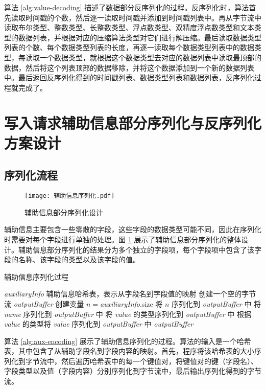 算法 \ref{alg:value-decoding} 描述了数据部分反序列化的过程。反序列化时，算法首先读取时间戳的个数，然后逐一读取时间戳并添加到时间戳列表中。再从字节流中读取布尔类型、整数类型、长整数类型、浮点数类型、双精度浮点数类型和文本类型的数据列表，并根据对应的压缩算法类型对它们进行解压缩。最后读取数据类型列表的个数、每个数据类型列表的长度，再逐一读取每个数据类型列表中的数据类型，每读取一个数据类型，就根据这个数据类型去对应的数据列表中读取最顶部的数据，然后将这个列表顶部的数据移除，并将这个数据添加到一个新的数据列表中。最后返回反序列化得到的时间戳列表、数据类型列表和数据列表，反序列化过程就完成了。

\section{写入请求辅助信息部分序列化与反序列化方案设计}
\subsection{序列化流程}
\begin{figure}
  \centering
  \texttt{[image: 辅助信息序列化.pdf]}
  \caption{辅助信息部分序列化设计}
  \label{fig:aux-encoding-general}
\end{figure}

辅助信息主要包含一些零散的字段，这些字段的数据类型可能不同，因此在序列化时需要对每个字段进行单独的处理。图 \ref{fig:aux-encoding-general} 展示了辅助信息部分序列化的整体设计。辅助信息部分序列化的结果分为多个独立的字段项，每个字段项中包含了该字段的名称、该字段的类型以及该字段的值。

\begin{algorithm}
  \caption{辅助信息序列化过程}
  \label{alg:aux-encoding}
  \small
  \begin{algorithmic}
    \REQUIRE \emph{auxiliaryInfo} 辅助信息哈希表，表示从字段名到字段值的映射
    \STATE 创建一个空的字节流 \emph{outputBuffer}
    \STATE 创建变量 $n = $\emph{auxiliaryInfo}.size
    \STATE 将 $n$ 序列化到 \emph{outputBuffer} 中
      \STATE 将 \emph{name} 序列化到 \emph{outputBuffer} 中
      \STATE 将 \emph{value} 的类型序列化到 \emph{outputBuffer} 中
      \STATE 根据 \emph{value} 的类型将 \emph{value} 序列化到 \emph{outputBuffer} 中
    \ENDFOR
    \RETURN \emph{outputBuffer}
  \end{algorithmic}
\end{algorithm}

算法 \ref{alg:aux-encoding} 展示了辅助信息序列化的过程。算法的输入是一个哈希表，其中包含了从辅助字段名到字段内容的映射。首先，程序将该哈希表的大小序列化到字节流中，然后遍历哈希表中的每一个键值对，将键值对的键（字段名）、字段类型以及值（字段内容）分别序列化到字节流中，最后输出序列化得到的字节流。

